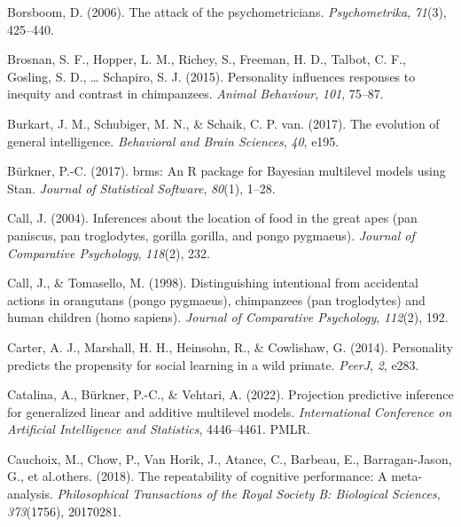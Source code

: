 \documentclass[
  man,floatsintext]{apa6}
\newlength{\cslhangindent}
\newenvironment{CSLReferences}[2] %
 {\begin{list}{}{%
  \setlength{\itemindent}{0pt}
  \setlength{\leftmargin}{0pt}
  \setlength{\parsep}{0pt}
  \ifodd #1
   \setlength{\leftmargin}{\cslhangindent}
   \setlength{\itemindent}{-1\cslhangindent}
  \fi
  \setlength{\itemsep}{#2\baselineskip}}}
 {\end{list}}
\begin{document}
\begin{CSLReferences}{1}{0}
Borsboom, D. (2006). The attack of the psychometricians. \emph{Psychometrika}, \emph{71}(3), 425--440.

Brosnan, S. F., Hopper, L. M., Richey, S., Freeman, H. D., Talbot, C. F., Gosling, S. D., \ldots{} Schapiro, S. J. (2015). Personality influences responses to inequity and contrast in chimpanzees. \emph{Animal Behaviour}, \emph{101}, 75--87.

Burkart, J. M., Schubiger, M. N., \& Schaik, C. P. van. (2017). The evolution of general intelligence. \emph{Behavioral and Brain Sciences}, \emph{40}, e195.

Bürkner, P.-C. (2017). {brms}: An {R} package for {Bayesian} multilevel models using {Stan}. \emph{Journal of Statistical Software}, \emph{80}(1), 1--28.

Call, J. (2004). Inferences about the location of food in the great apes (pan paniscus, pan troglodytes, gorilla gorilla, and pongo pygmaeus). \emph{Journal of Comparative Psychology}, \emph{118}(2), 232.

Call, J., \& Tomasello, M. (1998). Distinguishing intentional from accidental actions in orangutans (pongo pygmaeus), chimpanzees (pan troglodytes) and human children (homo sapiens). \emph{Journal of Comparative Psychology}, \emph{112}(2), 192.

Carter, A. J., Marshall, H. H., Heinsohn, R., \& Cowlishaw, G. (2014). Personality predicts the propensity for social learning in a wild primate. \emph{PeerJ}, \emph{2}, e283.

Catalina, A., Bürkner, P.-C., \& Vehtari, A. (2022). Projection predictive inference for generalized linear and additive multilevel models. \emph{International Conference on Artificial Intelligence and Statistics}, 4446--4461. PMLR.

Cauchoix, M., Chow, P., Van Horik, J., Atance, C., Barbeau, E., Barragan-Jason, G., et al.others. (2018). The repeatability of cognitive performance: A meta-analysis. \emph{Philosophical Transactions of the Royal Society B: Biological Sciences}, \emph{373}(1756), 20170281.


\end{CSLReferences}
\end{document}

